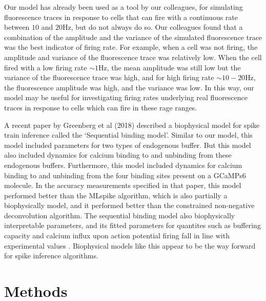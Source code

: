 Our model has already been used as a tool by our colleagues, for simulating fluorescence traces in response to cells that can fire with a continuous rate between $10$ and $20$Hz, but do not always do so. Our colleagues found that a combination of the amplitude and the variance of the simulated fluorescence trace was the best indicator of firing rate. For example, when a cell was not firing, the amplitude and variance of the fluorescence trace was relatively low. When the cell fired with a low firing rate $\sim 1$Hz, the mean amplitude was still low but the variance of the fluorescence trace was high, and for high firing rate $\sim 10-20$Hz, the fluorescence amplitude was high, and the variance was low. In this way, our model may be useful for investigating firing rates underlying real fluorescence traces in response to cells which can fire in these rage ranges.

A recent paper by Greenberg et al (2018) described a biophysical model for spike train inference called the `Sequential binding model'. Similar to our model, this model included parameters for two types of endogenous buffer. But this model also included dynamics for calcium binding to and unbinding from these endogenous buffers. Furthermore, this model included dynamics for calcium binding to and unbinding from the four binding sites present on a GCaMPs6 molecule. In the accuracy measurements specified in that paper, this model performed better than the MLspike algorithm, which is also partially a biophysically model, and it performed better than the constrained non-negative deconvolution algorithm. The sequential binding model also biophysically interpretable parameters, and its fitted parameters for quantites such as buffering capacity and calcium influx upon action potential firing fall in line with experimental values \parencite{greenberg}. Biophysical models like this appear to be the way forward for spike inference algorithms.

\section{Methods}
